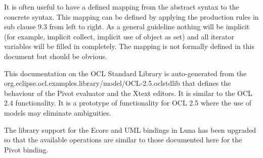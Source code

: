 \documentclass{scrreprt}   %
\begin{document}
It is often useful to have a defined mapping from the abstract syntax to the concrete syntax. This mapping can be defined
by applying the production rules in sub clause 9.3 from left to right. As a general guideline nothing will be implicit (for
example, implicit collect, implicit use of object as set) and all iterator variables will be filled in completely. The mapping
is not formally defined in this document but should be obvious.

\label{ocl:EvaluationSemantics}
%

This documentation on the OCL Standard Library is auto-generated from the
org.eclipse.ocl.examples.library/model/OCL-2.5.oclstdlib that defines
the behaviour of the Pivot evaluator and the Xtext editors. It is similar to the OCL 2.4 functionality.
It is a prototype of functionality for OCL 2.5 where the use of models may eliminate ambiguities.
		
The library support for the Ecore and UML bindings in Luna has been upgraded so that the available operations
are similar to those documented here for the Pivot binding.





\end{document}
